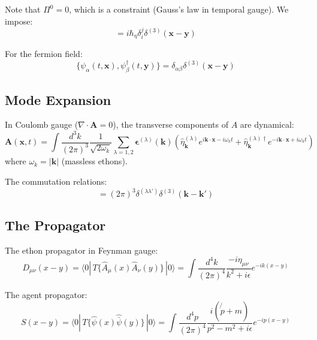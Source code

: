 \documentclass[12pt]{article}
\begin{document}
Note that $\Pi^0 = 0$, which is a constraint (Gauss's law in temporal gauge). We impose:
\begin{equation}
    [A_i(t, \mathbf{x}), \Pi^j(t, \mathbf{y})] = i\hbar_\eta \delta_i^j \delta^{(3)}(\mathbf{x} - \mathbf{y})
\end{equation}

For the fermion field:
\begin{equation}
    \{\psi_\alpha(t, \mathbf{x}), \psi_\beta^\dagger(t, \mathbf{y})\} = \delta_{\alpha\beta} \delta^{(3)}(\mathbf{x} - \mathbf{y})
\end{equation}

\subsection{Mode Expansion}

In Coulomb gauge ($\nabla \cdot \mathbf{A} = 0$), the transverse components of $A$ are dynamical:
\begin{equation}
    \mathbf{A}(\mathbf{x}, t) = \int \frac{d^3k}{(2\pi)^3} \frac{1}{\sqrt{2\omega_k}} \sum_{\lambda=1,2} \boldsymbol{\epsilon}^{(\lambda)}(\mathbf{k}) \left( \hat{\eta}_{\mathbf{k}}^{(\lambda)} e^{i\mathbf{k}\cdot\mathbf{x} - i\omega_k t} + \hat{\eta}_{\mathbf{k}}^{(\lambda)\dagger} e^{-i\mathbf{k}\cdot\mathbf{x} + i\omega_k t} \right)
\end{equation}
where $\omega_k = |\mathbf{k}|$ (massless ethons).

The commutation relations:
\begin{equation}
    [\hat{\eta}_{\mathbf{k}}^{(\lambda)}, \hat{\eta}_{\mathbf{k}'}^{(\lambda')\dagger}] = (2\pi)^3 \delta^{(\lambda\lambda')} \delta^{(3)}(\mathbf{k} - \mathbf{k}')
\end{equation}

\subsection{The Propagator}

The ethon propagator in Feynman gauge:
\begin{equation}
    D_{\mu\nu}(x - y) = \langle 0| \, T\{\hat{A}_\mu(x) \hat{A}_\nu(y)\} \, |0\rangle = \int \frac{d^4k}{(2\pi)^4} \frac{-i\eta_{\mu\nu}}{k^2 + i\epsilon} e^{-ik(x-y)}
\end{equation}

The agent propagator:
\begin{equation}
    S(x - y) = \langle 0| \, T\{\hat{\psi}(x) \hat{\bar{\psi}}(y)\} \, |0\rangle = \int \frac{d^4p}{(2\pi)^4} \frac{i(\not{p} + m)}{p^2 - m^2 + i\epsilon} e^{-ip(x-y)}
\end{equation}
\end{document}
